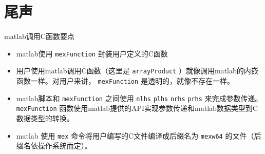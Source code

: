 \documentclass[10pt,a4paper,UTF8]{article}
\begin{document}
\section{尾声}
\label{sec:orgheadline11}


matlab调用C函数要点
\begin{itemize}
\item matlab使用 \texttt{mexFunction} 封装用户定义的C函数
\item 用户使用matlab调用C函数（这里是 \texttt{arrayProduct} ）就像调用matlab的内嵌函数一样。对用户来讲， \texttt{mexFunction} 是透明的，就像不存在一样。
\item matlab脚本和 \texttt{mexFunction} 之间使用 \texttt{nlhs} \texttt{plhs} \texttt{nrhs} \texttt{prhs} 来完成参数传递。 \texttt{mexFunction} 函数使用matlab提供的API实现参数传递和matlab数据类型到C数据类型的转换。
\item matlab 使用 \texttt{mex} 命令将用户编写的C文件编译成后缀名为 \texttt{mexw64} 的文件（后缀名依操作系统而定）。
\end{itemize}
\end{document}
